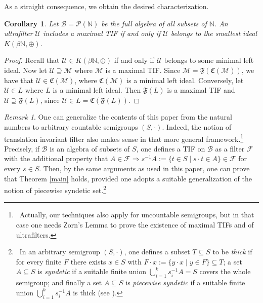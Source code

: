 \documentclass[10pt]{amsart}
\newtheorem{corollary}[theorem]{Corollary}
\theoremstyle{definition}
\theoremstyle{remark}
\newtheorem{remark}[theorem]{Remark}
\def\N{\mathbb{N}}
\def\B{\mathcal{B}}
\def\F{\mathcal{F}}
\def\U{\mathcal{U}}
\begin{document}
As a straight consequence, we obtain the desired characterization.

\begin{corollary}
Let $\B=\mathcal{P}(\N)$ be the full algebra of all subsets of $\N$. 
An ultrafilter $\U$ includes a maximal TIF if and only if
$\U$ belongs to the smallest ideal $K(\beta\N,\oplus)$.
\end{corollary}

\begin{proof}
Recall that $\U\in K(\beta\N,\oplus)$ if and only if
$\U$ belongs to some minimal left ideal.
Now let $\U\supseteq\mathcal{M}$ where $\mathcal{M}$ is
a maximal TIF. Since $\mathcal{M}=\mathfrak{F}(\mathfrak{C}(\mathcal{M}))$, 
we have that $\U\in\mathfrak{C}(\mathcal{M})$,
where $\mathfrak{C}(\mathcal{M})$ is a minimal left ideal.
Conversely, let $\U\in L$ where
$L$ is a minimal left ideal. Then $\mathfrak{F}(L)$ is a maximal TIF
and $\U\supseteq\mathfrak{F}(L)$, since
$\U\in L=\mathfrak{C}(\mathfrak{F}(L))$.
\end{proof}

\begin{remark}
One can generalize the contents of this paper
from the natural numbers to arbitrary countable semigroups $(S,\cdot)$.
Indeed, the notion of translation invariant filter also
makes sense in that more general framework.\footnote
{~Actually, our techniques also apply for uncountable semigroups,
but in that case one needs Zorn's Lemma
to prove the existence of maximal TIFs and of ultrafilters.}
Precisely, if $\B$ is an algebra of subsets of $S$,
one defines a TIF on $\B$ as a filter $\F$ with the
additional property that 
$A\in\F\Rightarrow s^{-1}A:=\{t\in S\mid s\cdot t\in A\}\in\F$ for every $s\in S$.
Then, by the same arguments as used in this paper,
one can prove that Theorem \ref{main} holds,
provided one adopts a suitable generalization of the
notion of piecewise syndetic set.\footnote
{~In an arbitrary semigroup $(S,\cdot)$, one
defines a subset $T\subseteq S$ to be \emph{thick} if
for every finite $F$ there exists $x\in S$ with 
$F\cdot x:=\{y\cdot x\mid y\in F\}\subseteq T$;
a set $A\subseteq S$ is \emph{syndetic} if a suitable finite union 
$\bigcup_{i=1}^k s_i^{-1}A=S$ 
covers the whole semigroup; and finally a set $A\subseteq S$ is
\emph{piecewise syndetic}
if a suitable finite union $\bigcup_{i=1}^k s_i^{-1}A$ is thick
(see \cite[\S 4.4 and \S 4.5]{hs}).
}
\end{remark}
\end{document}
